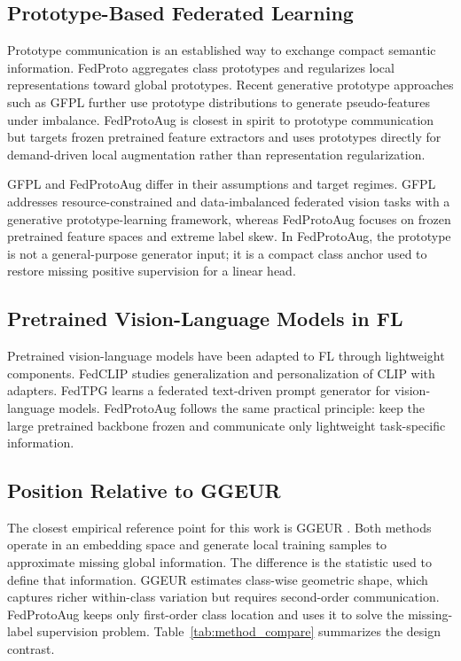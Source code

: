 ﻿\documentclass[runningheads]{llncs}
\newcommand{\method}{FedProtoAug}
\newcommand{\clip}{CLIP}
\begin{document}
\subsection{Prototype-Based Federated Learning}
Prototype communication is an established way to exchange compact semantic information. FedProto \cite{tan2022fedproto} aggregates class prototypes and regularizes local representations toward global prototypes. Recent generative prototype approaches such as GFPL \cite{lu2026gfpl} further use prototype distributions to generate pseudo-features under imbalance. \method{} is closest in spirit to prototype communication but targets frozen pretrained feature extractors and uses prototypes directly for demand-driven local augmentation rather than representation regularization.

GFPL and \method{} differ in their assumptions and target regimes. GFPL addresses resource-constrained and data-imbalanced federated vision tasks with a generative prototype-learning framework, whereas \method{} focuses on frozen pretrained feature spaces and extreme label skew. In \method, the prototype is not a general-purpose generator input; it is a compact class anchor used to restore missing positive supervision for a linear head.

\subsection{Pretrained Vision-Language Models in FL}
Pretrained vision-language models have been adapted to FL through lightweight components. FedCLIP \cite{lu2023fedclip} studies generalization and personalization of \clip{} with adapters. FedTPG \cite{qiu2024fedtpg} learns a federated text-driven prompt generator for vision-language models. \method{} follows the same practical principle: keep the large pretrained backbone frozen and communicate only lightweight task-specific information.

\subsection{Position Relative to GGEUR}
The closest empirical reference point for this work is GGEUR \cite{ma2025ggeur}. Both methods operate in an embedding space and generate local training samples to approximate missing global information. The difference is the statistic used to define that information. GGEUR estimates class-wise geometric shape, which captures richer within-class variation but requires second-order communication. \method{} keeps only first-order class location and uses it to solve the missing-label supervision problem. Table~\ref{tab:method_compare} summarizes the design contrast.
\end{document}
